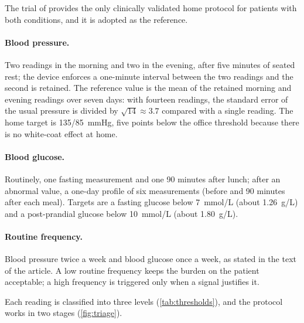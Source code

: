 The trial of \textcite{mihevc2025} provides the only clinically validated home protocol for patients with both conditions, and it is adopted as the reference.

\paragraph{Blood pressure.} Two readings in the morning and two in the evening, after five minutes of seated rest; the device enforces a one-minute interval between the two readings and the second is retained. The reference value is the mean of the retained morning and evening readings over seven days: with fourteen readings, the standard error of the usual pressure is divided by $\sqrt{14} \approx 3.7$ compared with a single reading. The home target is 135/85~mmHg, five points below the office threshold because there is no white-coat effect at home.

\paragraph{Blood glucose.} Routinely, one fasting measurement and one 90 minutes after lunch; after an abnormal value, a one-day profile of six measurements (before and 90 minutes after each meal). Targets are a fasting glucose below 7~mmol/L (about 1.26~g/L) and a post-prandial glucose below 10~mmol/L (about 1.80~g/L).

\paragraph{Routine frequency.} Blood pressure twice a week and blood glucose once a week, as stated in the text of the article. A low routine frequency keeps the burden on the patient acceptable; a high frequency is triggered only when a signal justifies it.

Each reading is classified into three levels (\cref{tab:thresholds}), and the protocol works in two stages (\cref{fig:triage}).

